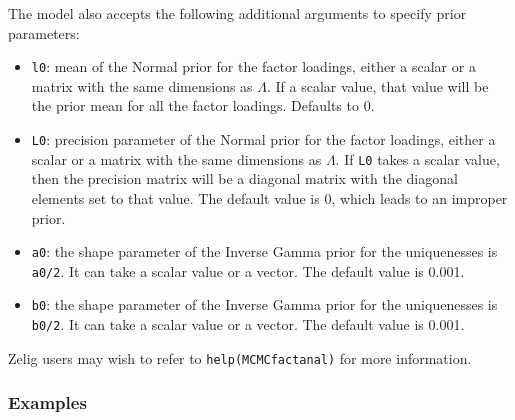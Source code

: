 \noindent The model also accepts the following additional arguments to 
specify prior parameters:

\begin{itemize}

\item \texttt{l0}: mean of the Normal prior for the factor
loadings, either a scalar or a matrix with the same dimensions as
$\Lambda$.  If a scalar value, that value will be the prior mean for
all the factor loadings. Defaults to 0.

\item \texttt{L0}: precision parameter of the Normal prior 
for the factor loadings, either a scalar or a matrix with the same
dimensions as $\Lambda$.  If \texttt{L0} takes a scalar value, then
the precision matrix will be a diagonal matrix with the diagonal
elements set to that value. The default value is 0, which leads to an
improper prior.

\item \texttt{a0}: the shape parameter of the Inverse Gamma prior for 
the uniquenesses is \texttt{a0/2}. It can take a scalar value or a
vector. The default value is 0.001.

\item \texttt{b0}: the shape parameter of the Inverse Gamma prior for 
the uniquenesses is \texttt{b0/2}. It can take a scalar value or a
vector. The default value is 0.001.

\end{itemize}

Zelig users may wish to refer to \texttt{help(MCMCfactanal)} for more 
information.



\subsubsection{Examples}

